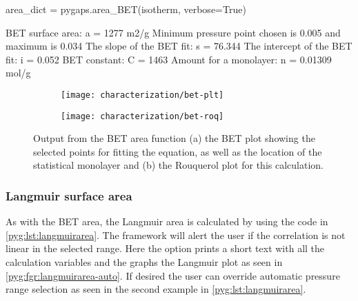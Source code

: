 \begin{samepage}
	\begin{python}[caption={Calculating a BET area},label={pyg:lst:betarea}]
area_dict = pygaps.area_BET(isotherm, verbose=True)
\end{python}
	\begin{pythonout}
BET surface area: a = 1277 m2/g
Minimum pressure point chosen is 0.005 and maximum is 0.034
The slope of the BET fit: 		s = 76.344
The intercept of the BET fit: 	i = 0.052
BET constant: 					C = 1463
Amount for a monolayer: 		n = 0.01309 mol/g
\end{pythonout}
\end{samepage}

\begin{figure}[!htb]
	\centering

	\begin{subfigure}{0.45\linewidth}
		\parbox[c]{0.1\linewidth}{\caption{}%
			\label{pyg:fgr:betarea-plt}}
		\parbox[b]{0.85\linewidth}{%
			\texttt{[image: characterization/bet-plt]}}
	\end{subfigure}%
	\begin{subfigure}{0.45\linewidth}
		\parbox[c]{0.1\linewidth}{\caption{}%
			\label{pyg:fgr:betarea-roq}}
		\parbox[b]{0.85\linewidth}{%
			\texttt{[image: characterization/bet-roq]}}
	\end{subfigure}%

	\caption{Output from the BET area function (a) the BET plot showing
		the selected points for fitting the equation, as well as the location
		of the statistical monolayer and (b) the Rouquerol plot for this
		calculation.}%
	\label{pyg:fgr:betarea}

\end{figure}


\subsubsection{Langmuir surface area}

As with the BET area, the Langmuir area is calculated by using the code in
\autoref{pyg:lst:langmuirarea}. The framework will alert the user
if the correlation is not linear in the selected range.
Here the  option prints a short
text with all the calculation variables and the graphs the
Langmuir plot as seen in \autoref{pyg:fgr:langmuirarea-auto}.
If desired the user can override
automatic pressure range selection as seen in the second example in
\autoref{pyg:lst:langmuirarea}.

